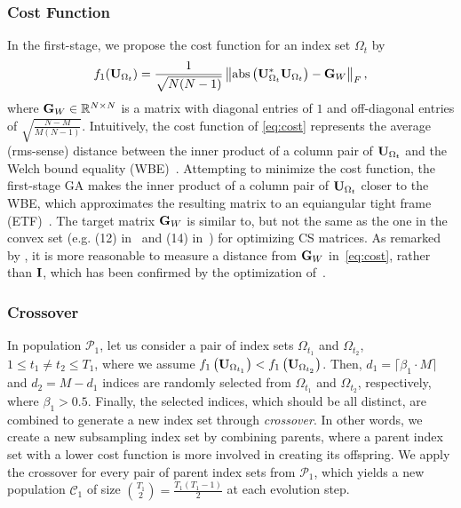 \documentclass[journal]{IEEEtran}
\newcommand{\R}{\ensuremath{\mathbb R}}
\newcommand{\mC}{\mathcal{C}}
\newcommand{\mP}{\mathcal{P}}
\newcommand{\Abu}{{\bf A}}
\newcommand{\Ibu}{{\bf I}}
\newcommand{\Gbu}{{\bf G}}
\newcommand{\Ubu}{{\bf U}}
\newcommand{\Wbu}{{\bf W}}
\numberwithin{const2}{const}
\begin{document}
\subsubsection{Cost Function}
In the first-stage, we propose the cost function for an index set $\Omega_t$ by
\begin{equation}\label{eq:cost}
	f_1(\Ubu_{\Omega_t}) = \frac{1}{\sqrt{N(N-1)}} \left \| {\rm abs} \left(\Ubu_{\Omega_t} ^* \Ubu_{\Omega_t} \right) - \Gbu_W \right \|_F,  
\end{equation}
where $\Gbu_W \in \R^{N \times N}$ is a matrix with diagonal entries of $1$ and off-diagonal entries 
of $\sqrt{\frac{N-M}{M(N-1)}}$.
Intuitively, the cost function of \eqref{eq:cost} represents
the average (rms-sense) distance between the inner product of a column pair of $\Ubu_{\Omega_t}$ 
and the Welch bound equality (WBE)~\cite{Welch:low}.
Attempting to minimize the cost function, 
the first-stage GA %
makes the inner product of a column pair of $\Ubu_{\Omega_t}$ closer to the WBE,
which approximates the resulting matrix to an equiangular tight frame (ETF)~\cite{Kov:frames}.
The target matrix $\Gbu_W$ is similar to, but not the same as the one in  
the convex set (e.g. (12) in~\cite{Vahid:grad} and (14) in~\cite{Li:opt}) for 
optimizing CS matrices.
As remarked by \cite{Li:opt},
it is more reasonable to measure a distance from $\Gbu_W$ in~\eqref{eq:cost}, rather than $\Ibu$, 
which has been confirmed by the optimization of~\cite{Vahid:grad}. %

\subsubsection{Crossover}
In population $\mP_1$,
let us 
consider a pair of index sets $\Omega_{t_1}$ and $\Omega_{t_2}$, $1 \leq t_1 \neq t_2 \leq T_1$, where
we assume
$f_1 \left(\Ubu_{\Omega_{t_1}} \right) < f_1 \left(\Ubu_{\Omega_{t_2}} \right)$. Then,
$d_1 = \lceil \beta_1 \cdot M \rceil$ and 
$d_2 = M - d_1$ indices are randomly selected from $\Omega_{t_1}$ and $\Omega_{t_2}$, respectively,
where $\beta_1 > 0.5$.
Finally, the selected indices, which should be all distinct, %
are combined to generate a new index set through \emph{crossover}. 
In other words, we create a new subsampling index set by combining parents,
where a parent index set with a lower cost function
is more involved in creating its offspring.
We apply the crossover for every pair of parent index sets from $\mP_1$, %
which yields a new population $\mC_1$ of size $ \binom{T_1}{2} = \frac{T_1(T_1-1)}{2}$ at each evolution step.
\end{document}
